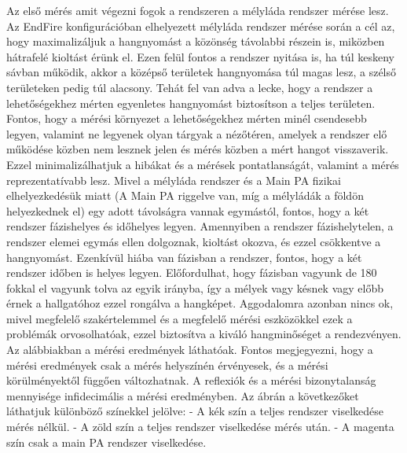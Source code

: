 Az első mérés amit végezni fogok a rendszeren a mélyláda rendszer mérése lesz.
Az EndFire konfigurációban elhelyezett mélyláda rendszer mérése során a cél az, hogy maximalizáljuk a hangnyomást a közönség távolabbi részein is,
miközben hátrafelé kioltást érünk el. Ezen felül fontos a rendszer nyitása is, ha túl keskeny sávban működik, akkor a középső területek
hangnyomása túl magas lesz, a szélső területeken pedig túl alacsony. Tehát fel van adva a lecke, hogy a rendszer a lehetőségekhez mérten
egyenletes hangnyomást biztosítson a teljes területen.
Fontos, hogy a mérési környezet a lehetőségekhez mérten minél csendesebb legyen, valamint
ne legyenek olyan tárgyak a nézőtéren, amelyek a rendszer elő működése közben
nem lesznek jelen és mérés közben a mért hangot visszaverik. Ezzel minimalizálhatjuk a
hibákat és a mérések pontatlanságát, valamint a mérés reprezentatívabb lesz.
Mivel a mélyláda rendszer és a Main PA fizikai elhelyezkedésük miatt (A Main PA riggelve van, míg a mélyládák a földön helyezkednek el)
egy adott távolságra vannak egymástól, fontos, hogy a két rendszer fázishelyes és időhelyes legyen.
Amennyiben a rendszer fázishelytelen, a rendszer elemei egymás ellen dolgoznak, kioltást okozva, és ezzel csökkentve a hangnyomást.
Ezenkívül hiába van fázisban a rendszer, fontos, hogy a két rendszer időben is helyes legyen. Előfordulhat, hogy fázisban vagyunk de 180 fokkal el vagyunk tolva
az egyik irányba, így a mélyek vagy késnek vagy előbb érnek a hallgatóhoz ezzel rongálva a hangképet.
Aggodalomra azonban nincs ok, mivel megfelelő szakértelemmel és a megfelelő mérési eszközökkel ezek a problémák orvosolhatóak, ezzel biztosítva
a kiváló hangminőséget a rendezvényen.
Az alábbiakban a mérési eredmények láthatóak.
Fontos megjegyezni, hogy a mérési eredmények csak a mérés helyszínén érvényesek, és a mérési körülményektől függően változhatnak.
A reflexiók és a mérési bizonytalanság mennyisége infidecimális a mérési eredményben.
Az ábrán a következőket láthatjuk különböző színekkel jelölve:
- A kék szín a teljes rendszer viselkedése mérés nélkül.
- A zöld szín a teljes rendszer viselkedése mérés után.
- A magenta szín csak a main PA rendszer viselkedése.

